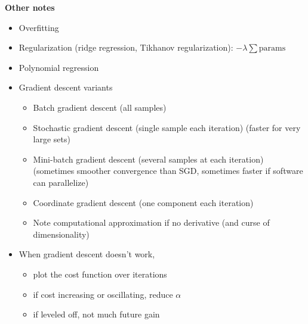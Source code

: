 \textbf{Other notes}
\begin{itemize}
\item Overfitting
\item Regularization (ridge regression, Tikhanov regularization): $-\lambda\sum \mbox{params}$
\item Polynomial regression
\item Gradient descent variants
  \begin{itemize}
  \item Batch gradient descent (all samples)
  \item Stochastic gradient descent (single sample each iteration) (faster for very large sets)
  \item Mini-batch gradient descent (several samples at each iteration)
  (sometimes smoother convergence than SGD, sometimes faster if software can parallelize)
  \item Coordinate gradient descent (one component each iteration)
  \item Note computational approximation if no derivative (and curse of dimensionality)
  \end{itemize}
\item When gradient descent doesn't work,
  \begin{itemize}
  \item plot the cost function over iterations
  \item if cost increasing or oscillating, reduce $\alpha$
  \item if leveled off, not much future gain
  \end{itemize}

\end{itemize}




